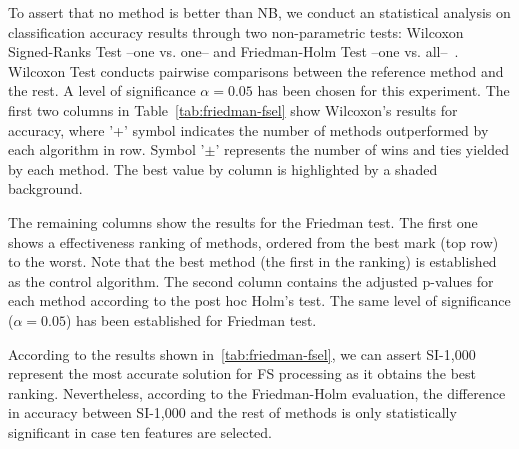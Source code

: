 \documentclass[preprint,12pt]{elsarticle}
\begin{document}
To assert that no method is better than NB, we conduct an statistical analysis on classification accuracy results through two non-parametric tests: Wilcoxon Signed-Ranks Test --one vs. one-- and Friedman-Holm Test --one vs. all--~\cite{garcia09, derrac11}. Wilcoxon Test conducts pairwise comparisons between the reference method and the rest. A level of significance $\alpha = 0.05$ has been chosen for this experiment. The first two columns in Table~\ref{tab:friedman-fsel} show Wilcoxon's results for accuracy, where '+' symbol indicates the number of methods outperformed by each algorithm in row. Symbol '$\pm$' represents the number of wins and ties yielded by each method. The best value by column is highlighted by a shaded background.  

The remaining columns show the results for the Friedman test. The first one shows a effectiveness ranking of methods, ordered from the best mark (top row) to the worst. Note that the best method (the first in the ranking) is established as the control algorithm. The second column contains the adjusted p-values for each method according to the post hoc Holm's test. The same level of significance ($\alpha = 0.05$) has been established for Friedman test.

According to the results shown in~\ref{tab:friedman-fsel}, we can assert SI-1,000 represent the most accurate solution for FS processing as it obtains the best ranking. Nevertheless, according to the Friedman-Holm evaluation, the difference in accuracy between SI-1,000 and the rest of methods is only statistically significant in case ten features are selected. 
\end{document}
